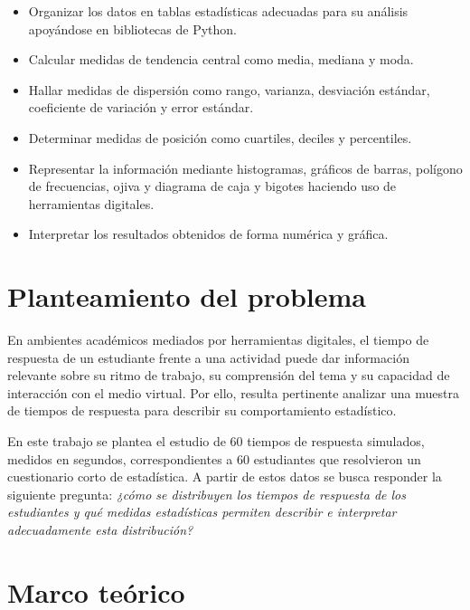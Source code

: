 \documentclass[12pt,letterpaper]{article}
\begin{document}
\begin{itemize}[leftmargin=1.2cm]
    \item Organizar los datos en tablas estadísticas adecuadas para su análisis apoyándose en bibliotecas de Python.
    \item Calcular medidas de tendencia central como media, mediana y moda.
    \item Hallar medidas de dispersión como rango, varianza, desviación estándar, coeficiente de variación y error estándar.
    \item Determinar medidas de posición como cuartiles, deciles y percentiles.
    \item Representar la información mediante histogramas, gráficos de barras, polígono de frecuencias, ojiva y diagrama de caja y bigotes haciendo uso de herramientas digitales.
    \item Interpretar los resultados obtenidos de forma numérica y gráfica.
\end{itemize}

\section{Planteamiento del problema}

En ambientes académicos mediados por herramientas digitales, el tiempo de respuesta de un estudiante frente a una actividad puede dar información relevante sobre su ritmo de trabajo, su comprensión del tema y su capacidad de interacción con el medio virtual. Por ello, resulta pertinente analizar una muestra de tiempos de respuesta para describir su comportamiento estadístico.

En este trabajo se plantea el estudio de 60 tiempos de respuesta simulados, medidos en segundos, correspondientes a 60 estudiantes que resolvieron un cuestionario corto de estadística. A partir de estos datos se busca responder la siguiente pregunta: \textit{¿cómo se distribuyen los tiempos de respuesta de los estudiantes y qué medidas estadísticas permiten describir e interpretar adecuadamente esta distribución?}

\section{Marco teórico}
\end{document}
